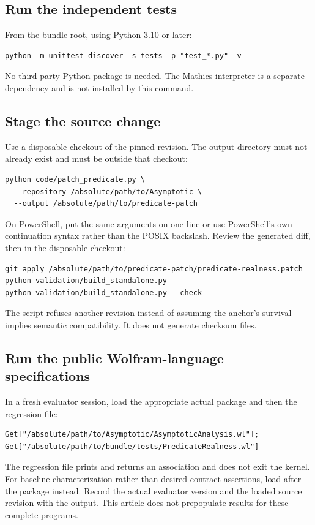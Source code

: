 \documentclass[11pt,letterpaper]{article}
\newcommand{\code}[1]{\texttt{\small\detokenize{#1}}}
\begin{document}
\subsection{Run the independent tests}
From the bundle root, using Python 3.10 or later:
\begin{lstlisting}
python -m unittest discover -s tests -p "test_*.py" -v
\end{lstlisting}
No third-party Python package is needed. The Mathics interpreter is a separate dependency and is not installed by this command.

\subsection{Stage the source change}
Use a disposable checkout of the pinned revision. The output directory must not already exist and must be outside that checkout:
\begin{lstlisting}
python code/patch_predicate.py \
  --repository /absolute/path/to/Asymptotic \
  --output /absolute/path/to/predicate-patch
\end{lstlisting}
On PowerShell, put the same arguments on one line or use PowerShell's own continuation syntax rather than the POSIX backslash. Review the generated diff, then in the disposable checkout:
\begin{lstlisting}
git apply /absolute/path/to/predicate-patch/predicate-realness.patch
python validation/build_standalone.py
python validation/build_standalone.py --check
\end{lstlisting}
The script refuses another revision instead of assuming the anchor's survival implies semantic compatibility. It does not generate checksum files.

\subsection{Run the public Wolfram-language specifications}
In a fresh evaluator session, load the appropriate actual package and then the regression file:
\begin{lstlisting}
Get["/absolute/path/to/Asymptotic/AsymptoticAnalysis.wl"];
Get["/absolute/path/to/bundle/tests/PredicateRealness.wl"]
\end{lstlisting}
The regression file prints and returns an association and does not exit the kernel. For baseline characterization rather than desired-contract assertions, load \code{code/observe_predicate.wl} after the package instead. Record the actual evaluator version and the loaded source revision with the output. This article does not prepopulate results for these complete programs.
\end{document}

